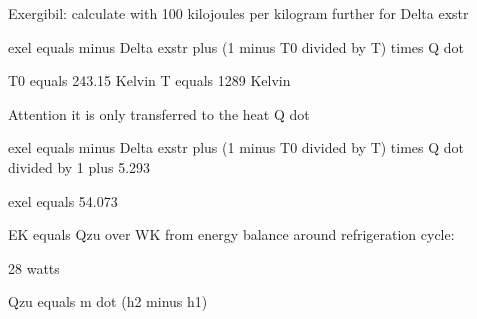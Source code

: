 Exergibil: calculate with 100 kilojoules per kilogram further for Delta exstr

exel equals minus Delta exstr plus (1 minus T0 divided by T) times Q dot

T0 equals 243.15 Kelvin  
T equals 1289 Kelvin

Attention it is only transferred to the heat Q dot

exel equals minus Delta exstr plus (1 minus T0 divided by T) times Q dot divided by 1 plus 5.293

exel equals 54.073

EK equals Qzu over WK from energy balance around refrigeration cycle:

28 watts 

Qzu equals m dot (h2 minus h1)